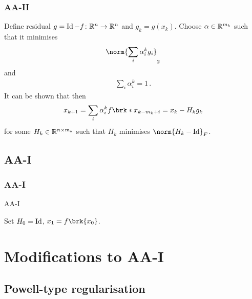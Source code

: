 \begin{frame}
	\frametitle{AA-II}
	Define residual $g=\operatorname{Id}-f\colon\mathbb{R}^n\to\mathbb{R}^n$ and $g_k = g(x_k)$.
	Choose $\alpha\in\mathbb{R}^{m_k}$ such that it minimises
	\begin{align*}
		\norm{\sum_i\alpha^k_ig_i}_2
	\end{align*}
	and
	\begin{align*}
		\sum_i\alpha^k_i = 1\,.
	\end{align*}
	It can be shown that then
	\begin{align*}
		x_{k+1} = \sum_i \alpha_i^kf\brk*{x_{k-m_k+i}} = x_k-H_kg_k
	\end{align*}
	for some $H_k\in\mathbb{R}^{n\times m_k}$ such that $H_k$ minimises $\norm{H_k-\Id}_F$.
\end{frame}


\subsection{AA-I}
\begin{frame}
	\frametitle{AA-I}
\end{frame}

\begin{frame}
	\begin{algorithm}[H]
	\caption{AA-I}
	\color{gray}
	\BlankLine
	Set $H_0=\operatorname{Id}$, $x_1=f\brk{x_0}$.
	
	\end{algorithm}
\end{frame}

\section{Modifications to AA-I}
\subsection{Powell-type regularisation}

